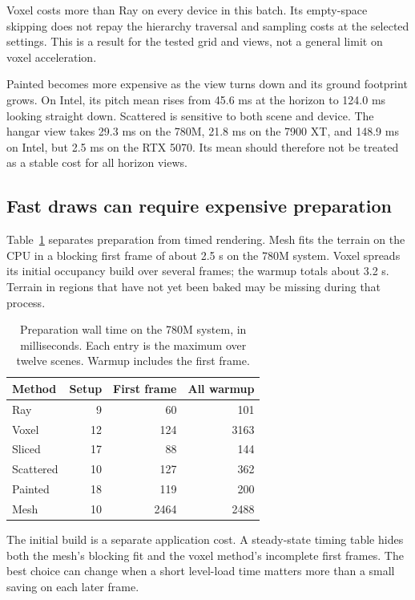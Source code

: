 \documentclass{jcgt}
\begin{document}
Voxel costs more than Ray on every device in this batch. Its empty-space skipping does not repay the hierarchy traversal and sampling costs at the selected settings. This is a result for the tested grid and views, not a general limit on voxel acceleration.

Painted becomes more expensive as the view turns down and its ground footprint grows. On Intel, its pitch mean rises from 45.6 ms at the horizon to 124.0 ms looking straight down. Scattered is sensitive to both scene and device. The hangar view takes 29.3 ms on the 780M, 21.8 ms on the 7900 XT, and 148.9 ms on Intel, but 2.5 ms on the RTX 5070. Its mean should therefore not be treated as a stable cost for all horizon views.

\subsection{Fast draws can require expensive preparation}\label{sec:prep}

Table~\ref{tab:prep} separates preparation from timed rendering. Mesh fits the terrain on the CPU in a blocking first frame of about 2.5 s on the 780M system. Voxel spreads its initial occupancy build over several frames; the warmup totals about 3.2 s. Terrain in regions that have not yet been baked may be missing during that process.

\begin{table}[tbp]\centering\small
\caption{Preparation wall time on the 780M system, in milliseconds. Each entry is the maximum over twelve scenes. Warmup includes the first frame.}\label{tab:prep}
\begin{tabular}{@{}lrrr@{}}
\toprule
Method & Setup & First frame & All warmup \\
\midrule
Ray & 9 & 60 & 101 \\
Voxel & 12 & 124 & 3163 \\
Sliced & 17 & 88 & 144 \\
Scattered & 10 & 127 & 362 \\
Painted & 18 & 119 & 200 \\
Mesh & 10 & 2464 & 2488 \\
\bottomrule
\end{tabular}
\end{table}

The initial build is a separate application cost. A steady-state timing table hides both the mesh's blocking fit and the voxel method's incomplete first frames. The best choice can change when a short level-load time matters more than a small saving on each later frame.
\end{document}

